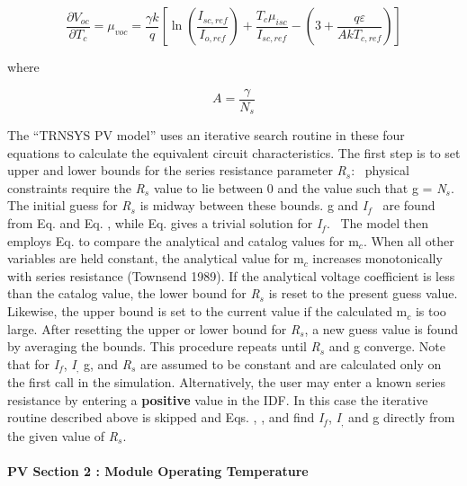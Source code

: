 \begin{equation}
\frac{{\partial {V_{oc}}}}{{\partial {T_c}}} = {\mu_{voc}} = \frac{{\gamma k}}{q}\left[ {\ln \left( {\frac{{{I_{sc,ref}}}}{{{I_{o,ref}}}}} \right) + \frac{{{T_c}\mu_{isc}^{}}}{{{I_{sc,ref}}}} - \left( {3 + \frac{{q\varepsilon }}{{Ak{T_{c,ref}}}}} \right)} \right]
\end{equation}

where

\begin{equation}
A = \frac{\gamma }{{{N_s}}}
\end{equation}

The ``TRNSYS PV model'' uses an iterative search routine in these four equations to calculate the equivalent circuit characteristics. The first step is to set upper and lower bounds for the series resistance parameter \emph{R\(_{s}\)}:~ physical constraints require the \emph{R\(_{s}\)} value to lie between 0 and the value such that g = \emph{N\(_{s}\)}. The initial guess for \emph{R\(_{s}\)} is midway between these bounds. g and \emph{I\(_{f}\)} ~are found from Eq. and Eq. , while Eq. gives a trivial solution for \emph{I\(_{f}\)}.~ The model then employs Eq. to compare the analytical and catalog values for m\(_{c}\). When all other variables are held constant, the analytical value for m\(_{c}\) increases monotonically with series resistance (Townsend 1989). If the analytical voltage coefficient is less than the catalog value, the lower bound for \emph{R\(_{s}\)} is reset to the present guess value. Likewise, the upper bound is set to the current value if the calculated m\(_{c}\) is too large. After resetting the upper or lower bound for \emph{R\(_{s}\)}, a new guess value is found by averaging the bounds. This procedure repeats until \emph{R\(_{s}\)} and g converge. Note that for \emph{I\(_{f}\)}, \emph{I\(_{,}\)} g, and \emph{R\(_{s}\)} are assumed to be constant and are calculated only on the first call in the simulation. Alternatively, the user may enter a known series resistance by entering a \textbf{positive} value in the IDF. In this case the iterative routine described above is skipped and Eqs. , , and find \emph{I\(_{f}\)}, \emph{I\(_{,}\)} and g directly from the given value of \emph{R\(_{s}\)}.

\paragraph{PV Section 2 : Module Operating Temperature}\label{pv-section-2-module-operating-temperature}

